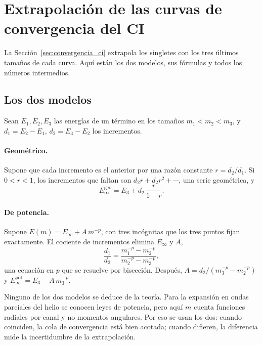 \documentclass[11pt,a4paper]{article}
\begin{document}
\section{Extrapolación de las curvas de convergencia del CI}
\label{det:extrapolacion}

La Sección~\ref{sec:convergencia_ci} extrapola los singletes con los tres últimos tamaños de cada
curva. Aquí están los dos modelos, sus fórmulas y todos los números intermedios.

\subsection{Los dos modelos}

Sean $E_1, E_2, E_3$ las energías de un término en los tamaños $m_1 < m_2 < m_3$, y $d_1 = E_2 -
E_1$, $d_2 = E_3 - E_2$ los incrementos.

\paragraph{Geométrico.} Supone que cada incremento es el anterior por una razón constante
$r = d_2/d_1$. Si $0 < r < 1$, los incrementos que faltan son $d_2 r + d_2 r^2 + \cdots$, una serie
geométrica, y
\begin{equation}
  E_\infty^{\text{geo}} = E_3 + d_2\,\frac{r}{1-r}.
\end{equation}

\paragraph{De potencia.} Supone $E(m) = E_\infty + A\,m^{-p}$, con tres incógnitas que los tres
puntos fijan exactamente. El cociente de incrementos elimina $E_\infty$ y $A$,
\begin{equation}
  \frac{d_1}{d_2} = \frac{m_1^{-p} - m_2^{-p}}{m_2^{-p} - m_3^{-p}},
\end{equation}
una ecuación en $p$ que se resuelve por bisección. Después,
$A = d_2/(m_3^{-p} - m_2^{-p})$ y $E_\infty^{\text{pot}} = E_3 - A\,m_3^{-p}$.

Ninguno de los dos modelos se deduce de la teoría. Para la expansión en ondas parciales del helio
se conocen leyes de potencia, pero aquí $m$ cuenta funciones radiales por canal y no momentos
angulares. Por eso se usan los dos: cuando coinciden, la cola de convergencia está bien acotada;
cuando difieren, la diferencia mide la incertidumbre de la extrapolación.
\end{document}
